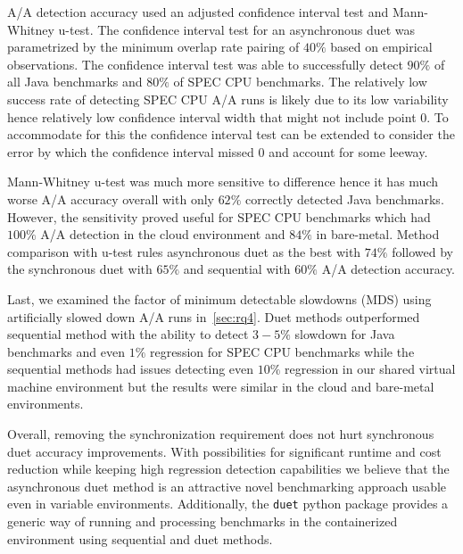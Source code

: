 A/A detection accuracy used an adjusted confidence interval test and \mbox{Mann-Whitney} \mbox{u-test}.
The confidence interval test for an asynchronous duet was parametrized by the minimum overlap rate pairing of $40\%$ based on empirical observations.
The confidence interval test was able to successfully detect $90\%$ of all Java benchmarks and $80\%$ of SPEC CPU benchmarks.
The relatively low success rate of detecting SPEC CPU A/A runs is likely due to its low variability hence relatively low confidence interval width that might not include point $0$.
To accommodate for this the confidence interval test can be extended to consider the error by which the confidence interval missed $0$ and account for some leeway.

\mbox{Mann-Whitney} \mbox{u-test} was much more sensitive to difference hence it has much worse A/A accuracy overall with only $62\%$ correctly detected Java benchmarks.
However, the sensitivity proved useful for SPEC CPU benchmarks which had $100\%$ A/A detection in the cloud environment and $84\%$ in \mbox{bare-metal}.
Method comparison with \mbox{u-test} rules asynchronous duet as the best with $74\%$ followed by the synchronous duet with $65\%$ and sequential with $60\%$ A/A detection accuracy.

Last, we examined the factor of minimum detectable slowdowns (MDS) using artificially slowed down A/A runs in~\cref{sec:rq4}.
Duet methods outperformed sequential method with the ability to detect $3-5\%$ slowdown for Java benchmarks and even $1\%$ regression for SPEC CPU benchmarks while the sequential methods had issues detecting even $10\%$ regression in our shared virtual machine environment but the results were similar in the cloud and bare-metal environments.

Overall, removing the synchronization requirement does not hurt synchronous duet accuracy improvements.
With possibilities for significant runtime and cost reduction while keeping high regression detection capabilities we believe that the asynchronous duet method is an attractive novel benchmarking approach usable even in variable environments.
Additionally, the \lstinline{duet} python package provides a generic way of running and processing benchmarks in the containerized environment using sequential and duet methods.

